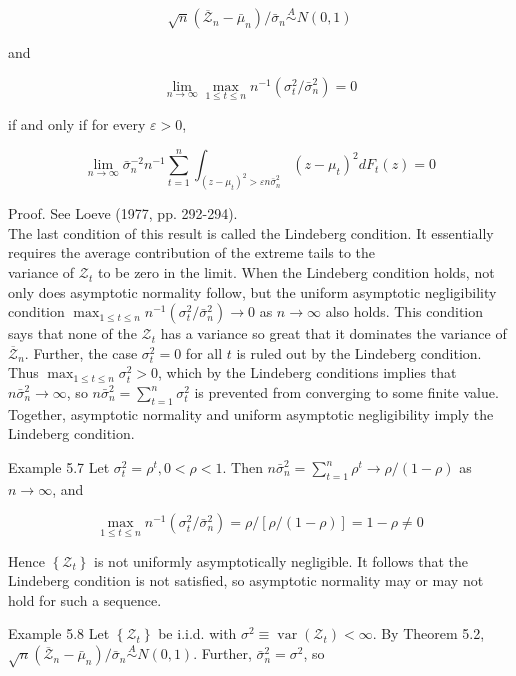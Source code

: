 \documentclass[10pt]{article}
\begin{document}
$$
\sqrt{n}\left(\overline{\mathcal{Z}}_{n}-\bar{\mu}_{n}\right) / \bar{\sigma}_{n} \stackrel{A}{\sim} N(0,1)
$$

and

$$
\lim _{n \rightarrow \infty} \max _{1 \leq t \leq n} n^{-1}\left(\sigma_{t}^{2} / \bar{\sigma}_{n}^{2}\right)=0
$$

if and only if for every $\varepsilon>0$,

$$
\lim _{n \rightarrow \infty} \bar{\sigma}_{n}^{-2} n^{-1} \sum_{t=1}^{n} \int_{\left(z-\mu_{t}\right)^{2}>\varepsilon n \bar{\sigma}_{n}^{2}}\left(z-\mu_{t}\right)^{2} d F_{t}(z)=0
$$

Proof. See Loeve (1977, pp. 292-294).\\
The last condition of this result is called the Lindeberg condition. It essentially requires the average contribution of the extreme tails to the\\
variance of $\mathcal{Z}_{t}$ to be zero in the limit. When the Lindeberg condition holds, not only does asymptotic normality follow, but the uniform asymptotic negligibility condition $\max _{1 \leq t \leq n} n^{-1}\left(\sigma_{t}^{2} / \bar{\sigma}_{n}^{2}\right) \rightarrow 0$ as $n \rightarrow \infty$ also holds. This condition says that none of the $\mathcal{Z}_{t}$ has a variance so great that it dominates the variance of $\overline{\mathcal{Z}}_{n}$. Further, the case $\sigma_{t}^{2}=0$ for all $t$ is ruled out by the Lindeberg condition. Thus $\max _{1 \leq t \leq n} \sigma_{t}^{2}>0$, which by the Lindeberg conditions implies that $n \bar{\sigma}_{n}^{2} \rightarrow \infty$, so $n \bar{\sigma}_{n}^{2}=\sum_{t=1}^{n} \sigma_{t}^{2}$ is prevented from converging to some finite value. Together, asymptotic normality and uniform asymptotic negligibility imply the Lindeberg condition.

Example 5.7 Let $\sigma_{t}^{2}=\rho^{t}, 0<\rho<1$. Then $n \bar{\sigma}_{n}^{2}=\sum_{t=1}^{n} \rho^{t} \rightarrow \rho /(1-\rho)$ as $n \rightarrow \infty$, and

$$
\max _{1 \leq t \leq n} n^{-1}\left(\sigma_{t}^{2} / \bar{\sigma}_{n}^{2}\right)=\rho /[\rho /(1-\rho)]=1-\rho \neq 0
$$

Hence $\left\{\mathcal{Z}_{t}\right\}$ is not uniformly asymptotically negligible. It follows that the Lindeberg condition is not satisfied, so asymptotic normality may or may not hold for such a sequence.

Example 5.8 Let $\left\{\mathcal{Z}_{t}\right\}$ be i.i.d. with $\sigma^{2} \equiv \operatorname{var}\left(\mathcal{Z}_{t}\right)<\infty$. By Theorem 5.2, $\sqrt{n}\left(\overline{\mathcal{Z}}_{n}-\bar{\mu}_{n}\right) / \bar{\sigma}_{n} \stackrel{A}{\sim} N(0,1)$. Further, $\bar{\sigma}_{n}^{2}=\sigma^{2}$, so
\end{document}
